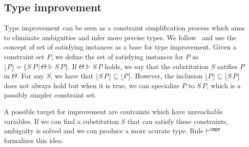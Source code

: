 \documentclass[a4paper, 11pt]{article}
\begin{document}
\subsection{Type improvement}

Type improvement can be seen as a constraint simplification 
process which aims to eliminate ambiguities and infer more 
precise types. We follow~\cite{Jones1995} and use the concept 
of set of satisfying instances as a base for type improvement.
Given a constraint set $P$, we define the set of satisfying
instances for $P$ as $\lfloor P \rfloor = \{S\:P\,|\,\Theta\Vdash S\,P\}$. 
If $\Theta\Vdash S\,P$ holds, we say that the substitution $S$ 
satifies $P$ in $\Theta$. For any $S$, we have that 
$\lfloor S\,P\rfloor \subseteq\lfloor P \rfloor$. However, the 
inclusion $\lfloor P \rfloor \subseteq \lfloor S\,P\rfloor$ does not 
always hold but when it is true, we can  specialize 
$P$ to $S\,P$, which is a possibly simpler constraint set.

A possible target for improvement are contraints which 
have unreachable variables. If we can find a substitution 
$S$ that can satisfy these constraints, ambiguity is solved 
and we can produce a more acurate type. Rule $\vdash^{\mathtt{impr}}$ formalizes 
this idea.
\end{document}

